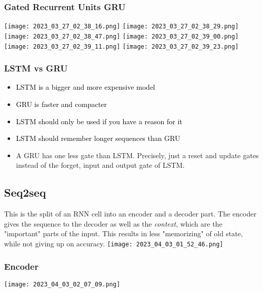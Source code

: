 \documentclass[main.tex,fontsize=8pt,paper=a4,paper=portrait,DIV=calc,]{scrartcl}
\begin{document}
\subsubsection{Gated Recurrent Units GRU}
\texttt{[image: 2023\_03\_27\_02\_38\_16.png]}\newline
\texttt{[image: 2023\_03\_27\_02\_38\_29.png]}\newline
\texttt{[image: 2023\_03\_27\_02\_38\_47.png]}\newline
\texttt{[image: 2023\_03\_27\_02\_39\_00.png]}\newline
\texttt{[image: 2023\_03\_27\_02\_39\_11.png]}\newline
\texttt{[image: 2023\_03\_27\_02\_39\_23.png]}\newline

\subsubsection{LSTM vs GRU}
\begin{itemize}
\item \textcolor{black}{LSTM is a bigger and more expensive model}
\item \textcolor{black}{GRU is faster and compacter}
\item \textcolor{black}{LSTM should only be used if you have a reason for it}
\item \textcolor{black}{LSTM should remember longer sequences than GRU}
\item A GRU has one less gate than LSTM. Precisely, just a reset and update gates instead of the forget, input and output gate of LSTM.
\end{itemize} 


\subsection{Seq2seq}
This is the split of an RNN cell into an encoder and a decoder part.\newline
The encoder gives the sequence to the decoder as well as the \emph{context}, which are the "important" parts of the input.\newline
This results in less "memorizing" of old state, while not giving up on accuracy.\newline
\texttt{[image: 2023\_04\_03\_01\_52\_46.png]}

\subsubsection{Encoder}
\texttt{[image: 2023\_04\_03\_02\_07\_09.png]}
\end{document}
